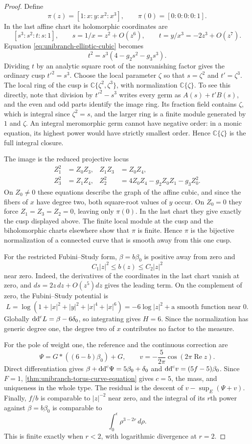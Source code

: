 \begin{proof}
Define
\[
 \pi(z)=[1:x:y:x^2:x^3],\qquad
 \pi(0)=[0:0:0:0:1].
\]
In the last affine chart its holomorphic coordinates are
\[
 [s^3:s^2:t:s:1],\qquad
 s=1/x=z^2+O(z^6),\qquad t=y/x^3=-2z^3+O(z^7).
\]
Equation \eqref{eq:unibranch-elliptic-cubic} becomes
\[
 t^2=s^3(4-g_2s^2-g_3s^3).
\]
Dividing $t$ by an analytic square root of the nonvanishing factor gives the ordinary cusp $t'^2=s^3$. Choose the local parameter $\zeta$ so that $s=\zeta^2$ and $t'=\zeta^3$. The local ring of the cusp is $\mathbb C\{\zeta^2,\zeta^3\}$, with normalization $\mathbb C\{\zeta\}$. To see this directly, note that division by $t'^2-s^3$ writes every germ as $A(s)+t'B(s)$, and the even and odd parts identify the image ring. Its fraction field contains $\zeta$, which is integral since $\zeta^2=s$, and the larger ring is a finite module generated by $1$ and $\zeta$. An integral meromorphic germ cannot have negative order: in a monic equation, its highest power would have strictly smallest order. Hence $\mathbb C\{\zeta\}$ is the full integral closure.

The image is the reduced projective locus
\[
 \begin{aligned}
 Z_1^2&=Z_0Z_3,& Z_1Z_3&=Z_0Z_4,\\
 Z_3^2&=Z_1Z_4,&
 Z_2^2&=4Z_0Z_4-g_2Z_0Z_1-g_3Z_0^2.
 \end{aligned}
\]
On $Z_0\ne0$ these equations describe the graph of the affine cubic, and since the fibers of $x$ have degree two, both square-root values of $y$ occur. On $Z_0=0$ they force $Z_1=Z_3=Z_2=0$, leaving only $\pi(0)$. In the last chart they give exactly the cusp displayed above. The finite local module at the cusp and the biholomorphic charts elsewhere show that $\pi$ is finite. Hence $\pi$ is the bijective normalization of a connected curve that is smooth away from this one cusp.

For the restricted Fubini--Study form, $\beta=b\beta_0$ is positive away from zero and
\[
 C_1|z|^2\leq b(z)\leq C_2|z|^2
\]
near zero. Indeed, the derivatives of the coordinates in the last chart vanish at zero, and $ds=2z\,dz+O(z^5)dz$ gives the leading term. On the complement of zero, the Fubini--Study potential is
\[
 L=\log(1+|x|^2+|y|^2+|x|^4+|x|^6)
   =-6\log|z|^2+\text{a smooth function near }0.
\]
Globally $\mathrm{dd}^{\mathrm{c}} L=\beta-6\delta_0$, so integrating gives $H=6$. Since the normalization has generic degree one, the degree two of $x$ contributes no factor to the measure.

For the pole of weight one, the reference and the continuous correction are
\[
 \Psi=G*((6-b)\beta_0)+G,
 \qquad v=-\frac5{2\pi}\cos(2\pi\operatorname{Re}z).
\]
Direct differentiation gives $\beta+\mathrm{dd}^{\mathrm{c}}\Psi=5\beta_0+\delta_0$ and $\mathrm{dd}^{\mathrm{c}} v=(5f-5)\beta_0$. Since $F=1$, \cref{thm:unibranch-torus-curve-equation} gives $c=5$, the mass, and uniqueness in the whole type. The residual is the descent of $v-\sup_E(\Psi+v)$. Finally, $f/b$ is comparable to $|z|^{-2}$ near zero, and the integral of its $r$th power against $\beta=b\beta_0$ is comparable to
\[
 \int_0^\epsilon \rho^{3-2r}\,d\rho.
\]
This is finite exactly when $r<2$, with logarithmic divergence at $r=2$.
\end{proof}

